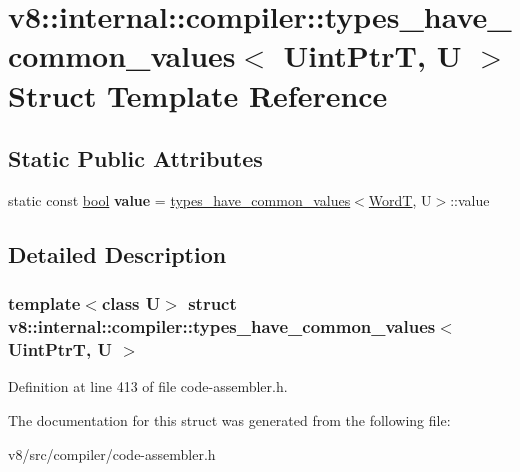 \hypertarget{structv8_1_1internal_1_1compiler_1_1types__have__common__values_3_01UintPtrT_00_01U_01_4}{}\section{v8\+:\+:internal\+:\+:compiler\+:\+:types\+\_\+have\+\_\+common\+\_\+values$<$ Uint\+PtrT, U $>$ Struct Template Reference}
\label{structv8_1_1internal_1_1compiler_1_1types__have__common__values_3_01UintPtrT_00_01U_01_4}
\subsection*{Static Public Attributes}
\begin{DoxyCompactItemize}
\item 
\mbox{\label{structv8_1_1internal_1_1compiler_1_1types__have__common__values_3_01UintPtrT_00_01U_01_4_a59b15f33326ca85c9616b71441589b4e}} 
static const \mbox{\hyperlink{classbool}{bool}} {\bfseries value} = \mbox{\hyperlink{structv8_1_1internal_1_1compiler_1_1types__have__common__values}{types\+\_\+have\+\_\+common\+\_\+values}}$<$\mbox{\hyperlink{structv8_1_1internal_1_1WordT}{WordT}}, U$>$\+::value
\end{DoxyCompactItemize}


\subsection{Detailed Description}
\subsubsection*{template$<$class U$>$\newline
struct v8\+::internal\+::compiler\+::types\+\_\+have\+\_\+common\+\_\+values$<$ Uint\+Ptr\+T, U $>$}



Definition at line 413 of file code-\/assembler.\+h.



The documentation for this struct was generated from the following file\+:\begin{DoxyCompactItemize}
\item 
v8/src/compiler/code-\/assembler.\+h\end{DoxyCompactItemize}
